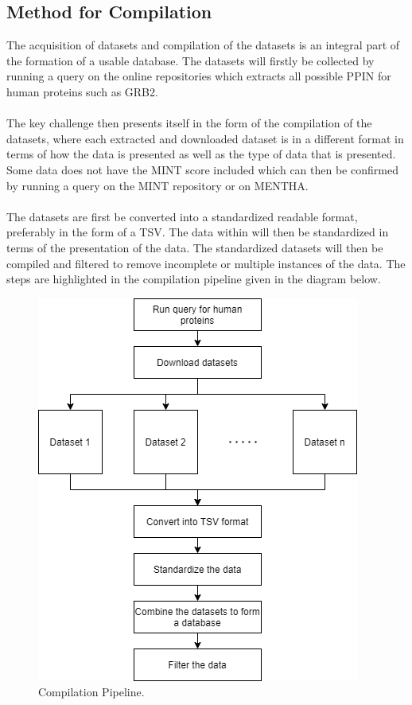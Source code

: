 \subsection{Method for Compilation}
The acquisition of datasets and compilation of the datasets is an integral part of the formation of a usable database. The datasets will firstly be collected by running a query on the online repositories which extracts all possible PPIN for human proteins such as GRB2.\\\\The key challenge then presents itself in the form of the compilation of the datasets, where each extracted and downloaded dataset is in a different format in terms of how the data is presented as well as the type of data that is presented. Some data does not have the MINT score included which can then be confirmed by running a query on the MINT repository or on MENTHA.\\\\
The datasets are first be converted into a standardized readable format, preferably in the form of a TSV. The data within will then be standardized in terms of the presentation of the data. The standardized datasets will then be compiled and filtered to remove incomplete or multiple instances of the data. The steps are highlighted in the compilation pipeline given in the diagram below.
\begin{figure}[h!]
    \centering
\includegraphics[scale=1]{Final-Report-Kavish-1/chapters/compilation-pipeline.drawio.png}
\caption{Compilation Pipeline.}
\end{figure}


